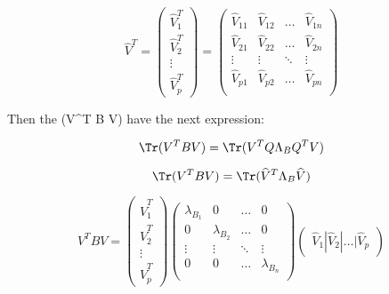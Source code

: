 \begin{equation*}
\widehat{V}^T = 	
\left(\!
    \begin{array}{c}
      \widehat{V}_1^T\\
      \widehat{V}_2^T\\
      \vdots \\
      \widehat{V}_p^T
    \end{array}
  \!\right)   = 
\left(\!
    \begin{array}{cccc}
      \widehat{V}_{11} & \widehat{V}_{12} & \hdots & \widehat{V}_{1n}\\
      \widehat{V}_{21} & \widehat{V}_{22} & \hdots & \widehat{V}_{2n}\\
      \vdots &  \vdots &\ddots & \vdots\\
      \widehat{V}_{p1} & \widehat{V}_{p2} & \hdots & \widehat{V}_{pn}\\
    \end{array}
  \!\right) 
\end{equation*}

Then the \Tr(V^T B V) have the next expression:

\begin{equation*}
\Tr(V^T B V) = \Tr(V^T Q \Lambda_{B} Q^T V) 	
\end{equation*}

\begin{equation*}
\Tr(V^T B V)  = \Tr(\widehat{V}^T \Lambda_{B} \widehat{V})
\end{equation*}

\begin{equation*}
V^T B V = 
\left(\!
    \begin{array}{c}
      \widehat{V}_1^T\\
      \widehat{V}_2^T\\
      \vdots \\
      \widehat{V}_p^T
    \end{array}
  \!\right) 
  \left(\!
    \begin{array}{cccc}
      \lambda_{B_1} & 0 & \hdots & 0\\
      0 & \lambda_{B_2} & \hdots & 0\\
      \vdots &  \vdots &\ddots & \vdots\\
      0 & 0 & \hdots & \lambda_{B_n}\\
    \end{array}
  \!\right) 
  \left(\!\begin{array}{c}
      \widehat{V}_1 |
      \widehat{V}_2 |
      \hdots |
      \widehat{V}_p
    \end{array}
  \!\right) 
\end{equation*} 

